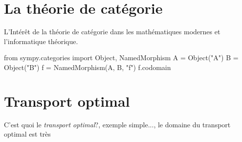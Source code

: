 \section{La théorie de catégorie}
L’Intérêt de la théorie de catégorie dans les mathématiques modernes et l'informatique théorique. 
\begin{python}
from sympy.categories import Object, NamedMorphism
A = Object("A")
B = Object("B")
f = NamedMorphism(A, B, "f")
f.codomain
\end{python}

\section{Transport optimal}
C'est quoi le \textit{ transport optimal}?, exemple simple..., le domaine du transport optimal
est très 
